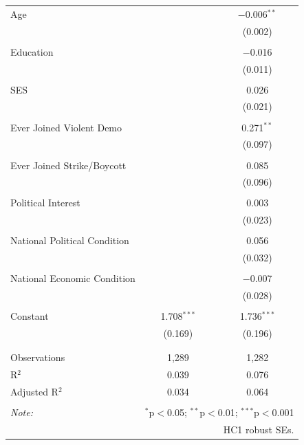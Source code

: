 \begin{table}[!htbp]
\begin{tabular}{@{\extracolsep{5pt}}lcc}
 Age &  & $-$0.006$^{**}$ \\ 
  &  & (0.002) \\ 
  & & \\ 
 Education &  & $-$0.016 \\ 
  &  & (0.011) \\ 
  & & \\ 
 SES &  & 0.026 \\ 
  &  & (0.021) \\ 
  & & \\ 
 Ever Joined Violent Demo &  & 0.271$^{**}$ \\ 
  &  & (0.097) \\ 
  & & \\ 
 Ever Joined Strike/Boycott &  & 0.085 \\ 
  &  & (0.096) \\ 
  & & \\ 
 Political Interest &  & 0.003 \\ 
  &  & (0.023) \\ 
  & & \\ 
 National Political Condition &  & 0.056 \\ 
  &  & (0.032) \\ 
  & & \\ 
 National Economic Condition &  & $-$0.007 \\ 
  &  & (0.028) \\ 
  & & \\ 
 Constant & 1.708$^{***}$ & 1.736$^{***}$ \\ 
  & (0.169) & (0.196) \\ 
  & & \\ 
\hline \\[-1.8ex] 
Observations & 1,289 & 1,282 \\ 
R$^{2}$ & 0.039 & 0.076 \\ 
Adjusted R$^{2}$ & 0.034 & 0.064 \\ 
\hline 
\hline \\[-1.8ex] 
\textit{Note:}  & \multicolumn{2}{r}{$^{*}$p$<$0.05; $^{**}$p$<$0.01; $^{***}$p$<$0.001} \\ 
 & \multicolumn{2}{r}{HC1 robust SEs.} \\ 
\end{tabular} 
\end{table} 
